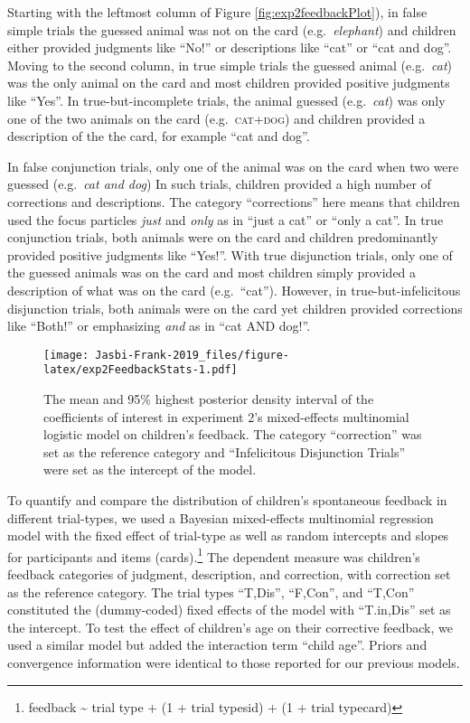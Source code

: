 \documentclass[
  english,
  ,man,floatsintext]{apa6}
\begin{document}
Starting with the leftmost column of Figure \ref{fig:exp2feedbackPlot}), in false simple trials the guessed animal was not on the card (e.g.~\emph{elephant}) and children either provided judgments like \enquote{No!} or descriptions like \enquote{cat} or \enquote{cat and dog}. Moving to the second column, in true simple trials the guessed animal (e.g.~\emph{cat}) was the only animal on the card and most children provided positive judgments like \enquote{Yes}. In true-but-incomplete trials, the animal guessed (e.g.~\emph{cat}) was only one of the two animals on the card (e.g.~\textsc{cat+dog}) and children provided a description of the the card, for example \enquote{cat and dog}.

In false conjunction trials, only one of the animal was on the card when two were guessed (e.g.~\emph{cat and dog}) In such trials, children provided a high number of corrections and descriptions. The category \enquote{corrections} here means that children used the focus particles \emph{just} and \emph{only} as in \enquote{just a cat} or \enquote{only a cat}. In true conjunction trials, both animals were on the card and children predominantly provided positive judgments like \enquote{Yes!}. With true disjunction trials, only one of the guessed animals was on the card and most children simply provided a description of what was on the card (e.g.~\enquote{cat}). However, in true-but-infelicitous disjunction trials, both animals were on the card yet children provided corrections like \enquote{Both!} or emphasizing \emph{and} as in \enquote{cat AND dog!}.

\begin{figure}
\centering
\texttt{[image: Jasbi-Frank-2019\_files/figure-latex/exp2FeedbackStats-1.pdf]}
\caption{\label{fig:exp2FeedbackStats}The mean and 95\% highest posterior density interval of the coefficients of interest in experiment 2's mixed-effects multinomial logistic model on children's feedback. The category \enquote{correction} was set as the reference category and \enquote{Infelicitous Disjunction Trials} were set as the intercept of the model.}
\end{figure}

To quantify and compare the distribution of children's spontaneous feedback in different trial-types, we used a Bayesian mixed-effects multinomial regression model with the fixed effect of trial-type as well as random intercepts and slopes for participants and items (cards).\footnote{feedback \textasciitilde{} trial type + (1 + trial type\textbar sid) + (1 + trial type\textbar card)} The dependent measure was children's feedback categories of judgment, description, and correction, with correction set as the reference category. The trial types \enquote{T,Dis}, \enquote{F,Con}, and \enquote{T,Con} constituted the (dummy-coded) fixed effects of the model with \enquote{T.in,Dis} set as the intercept. To test the effect of children's age on their corrective feedback, we used a similar model but added the interaction term \enquote{child age}. Priors and convergence information were identical to those reported for our previous models.
\end{document}
